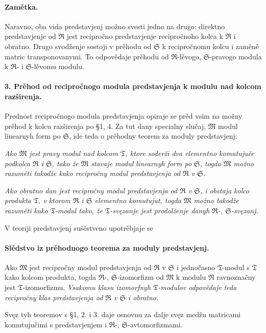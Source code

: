 \documentclass[11pt]{article}
\providecommand{\frM}{\mathfrak M}
\providecommand{\frN}{\mathfrak N}
\providecommand{\frR}{\mathfrak R}
\providecommand{\frS}{\mathfrak S}
\providecommand{\frT}{\mathfrak T}
\begin{document}
\paragraph{Zamětka.}
Naravno, oba vida predstavjenj možno svesti jedno na drugo: direktno predstavjenje od \(\frR\) jest recipročno predstavjenje recipročnoho kolca k \(\frR\) i obratno. Drugo svodženje sostoji v prěhodu od \(\frS\) k recipročnomu kolcu i zaměně matric transponovanymi. To odpovědaje prěhodu od \(\frR\)-lěvogo, \(\frS\)-pravogo modula k \(\frR\)- i \(\frS\)-lěvomu modulu.

\paragraph{3. Prěhod od recipročnogo modula predstavjenja k modulu nad kolcom razširenja.}
Prednost recipročnogo modula predstavjenja opiraje se prěd vsim na možny prěhod k kolcu razširenja po §1, 4. Za tut dany specialny slučaj, \(\frM\) modul linearnyh form po \(\frS\), ide teda o prěhodny teorem za moduly predstavjenj:

\emph{Ako \(\frM\) jest pravy modul nad kolcom \(\frT\), ktore soderži dva elementno komutujuče podkolca \(\frR\) i \(\frS\), tako že \(\frM\) stavaje modul linearnyh form po \(\frS\), togda \(\frM\) možno razuměti takodže kako recipročny modul predstavjenja od \(\frR\) v \(\frS\).}

\emph{Ako obratno dan jest recipročny modul predstavjenja od \(\frR\) v \(\frS\), i obstaja kolco produkta \(\frT\), v ktorom \(\frR\) i \(\frS\) elementno komutujut, togda \(\frM\) možno takodže razuměti kako \(\frT\)-modul tako, že \(\frT\)-svęzanje jest prodolženje danyh \(\frR\)-, \(\frS\)-svęzanj.}

V teoriji predstavjenj suščstveno upotrěbjaje se

\paragraph{Slědstvo iz prěhodnogo teorema za moduly predstavjenj.}
Ako \(\frM\) jest recipročny modul predstavjenja od \(\frR\) v \(\frS\) i jednočasno \(\frT\)-modul s \(\frT\) kako kolcom produkta, togda \(\frR\)-, \(\frS\)-izomorfizm od \(\frM\) k modulu \(\frN\) ravnoznačny jest \(\frT\)-izomorfizmu. \emph{Vsakomu klasu izomorfnyh \(\frT\)-modulov odpovědaje teda recipročny klas predstavjenja od \(\frR\) v \(\frS\) i obratno.}

Svęz tyh teoremov s §1, 2. i 3. daje osnovnu za dalje svęz medžu matricami komutujučimi s predstavjenjem i \(\frR\)-, \(\frS\)-avtomorfizmami.
\end{document}
